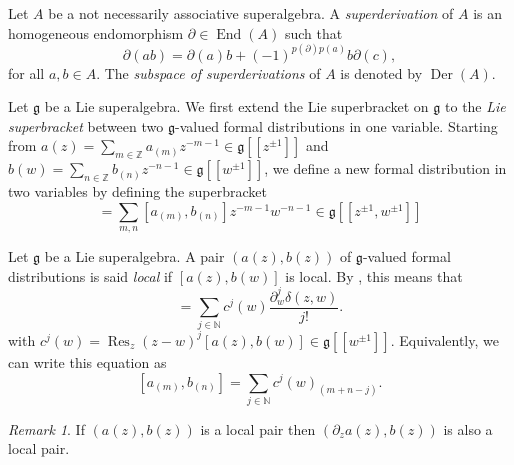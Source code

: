 \documentclass[a4paper, 12pt, reqno]{amsart}
\theoremstyle{remark}
\newtheorem{remark}[theorem]{Remark}
\numberwithin{equation}{subsection}
\DeclareMathOperator{\End}{End}
\DeclareMathOperator{\Res}{Res}
\DeclareMathOperator{\Der}{Der}
\begin{document}
Let $A$ be a not necessarily associative superalgebra.
A \emph{superderivation} of $A$ is an homogeneous endomorphism $\partial \in \End(A)$ such that
\begin{equation*}
  \partial(ab) = \partial(a)b + (-1)^{p(\partial)p(a)}b\partial(c),
\end{equation*}
for all $a, b \in A$.
The \emph{subspace of superderivations} of $A$ is denoted by $\Der(A)$.

Let $\mathfrak{g}$ be a Lie superalgebra.
We first extend the Lie superbracket on $\mathfrak{g}$ to the \emph{Lie superbracket} between two $\mathfrak{g}$-valued formal distributions in one variable. Starting from $a(z) = \sum_{m \in \mathbb{Z}}a_{(m)}z^{-m - 1} \in \mathfrak{g}[[z^{\pm 1}]]$ and $b(w) = \sum_{n \in \mathbb{Z}}b_{(n)}z^{-n - 1} \in \mathfrak{g}[[w^{\pm 1}]]$, we define a new formal distribution in two variables by defining the superbracket
\begin{equation*}
  [a(z), b(w)] = \sum_{m, n}[a_{(m)}, b_{(n)}]z^{-m - 1}w^{-n - 1} \in \mathfrak{g}[[z^{\pm 1}, w^{\pm 1}]]
\end{equation*}

Let $\mathfrak{g}$ be a Lie superalgebra.
A pair $(a(z), b(z))$ of $\mathfrak{g}$-valued formal distributions is said \emph{local} if $[a(z), b(w)]$ is local.
By , this means that
\begin{equation*}
  [a(z), b(w)] = \sum_{j \in \mathbb{N}}c^j(w)\frac{\partial^j_w\delta(z, w)}{j!}.
\end{equation*}
with $c^j(w) = \Res_z(z - w)^j[a(z), b(w)] \in \mathfrak{g}[[w^{\pm 1}]]$.
Equivalently, we can write this equation as
\begin{equation}
  \label{eq:3}
  [a_{(m)}, b_{(n)}] = \sum_{j \in \mathbb{N}}c^j(w)_{(m + n - j)}.
\end{equation}
\begin{remark}
  \label{rmk:2}
  If $(a(z), b(z))$ is a local pair then $(\partial_za(z), b(z))$ is also a local pair.
\end{remark}
\end{document}
